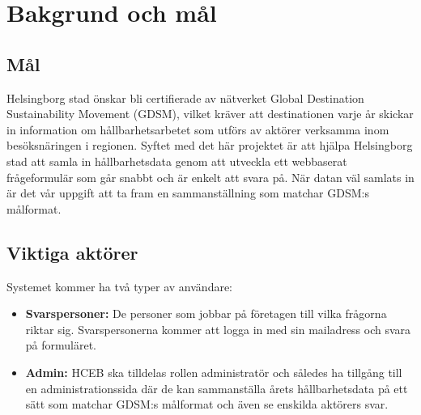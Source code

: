 \documentclass{article}
\begin{document}
\section{Bakgrund och mål}
                                                                                                                
    \subsection{Mål}
      Helsingborg stad önskar bli certifierade av nätverket Global Destination Sustainability Movement (GDSM), vilket kräver att destinationen varje år skickar in information om hållbarhetsarbetet som utförs av aktörer verksamma inom besöksnäringen i regionen. Syftet med det här projektet är att hjälpa Helsingborg stad att samla in hållbarhetsdata genom att utveckla ett webbaserat frågeformulär som går snabbt och är enkelt att svara på. När datan väl samlats in är det vår uppgift att ta fram en sammanställning som matchar GDSM:s målformat. 
        
    \subsection{Viktiga aktörer}
    Systemet kommer ha två typer av användare:
    \begin{itemize}
        \item \textbf{Svarspersoner:} De personer som jobbar på företagen till vilka frågorna riktar sig. Svarspersonerna kommer att logga in med sin mailadress och svara på formuläret.
        \item \textbf{Admin:} HCEB ska tilldelas rollen administratör och således ha tillgång till en administrationssida där de kan sammanställa årets hållbarhetsdata på ett sätt som matchar GDSM:s målformat och även se enskilda aktörers svar.
     \end{itemize}
    
\end{document}
